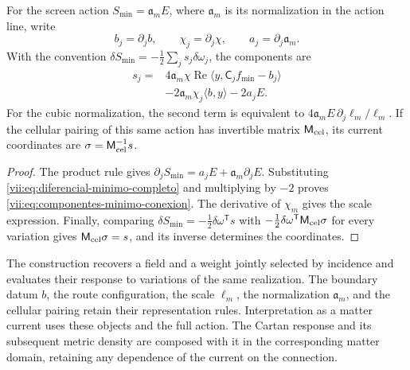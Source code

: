 \begin{theorem}
\label{vii:thm:componentes-minimo-conexion}
For the screen action
\(S_{\min}=\mathfrak a_m E\), where \(\mathfrak a_m\) is its
normalization in the action line, write
\[
 b_j=\partial_jb,\qquad \chi_j=\partial_j\chi,
 \qquad a_j=\partial_j\mathfrak a_m.
\]
With the convention \(\delta S_{\min}=-\tfrac12\sum_j s_j\delta\omega_j\),
the components are
\begin{equation}
 \begin{split}
 s_j={}&4\mathfrak a_m\chi\operatorname{Re}
             \langle y,\mathsf C_jf_{\min}-b_j\rangle\\
      &-2\mathfrak a_m\chi_j\langle b,y\rangle-2a_jE.
 \end{split}
 \label{vii:eq:componentes-minimo-conexion}
\end{equation}
For the cubic normalization, the second term is equivalent to
\(4\mathfrak a_m E\,\partial_j\ell_m/\ell_m\).
If the cellular pairing of this same action has invertible matrix
\(\mathsf M_{\rm cel}\), its current coordinates are
\(\sigma=\mathsf M_{\rm cel}^{-1}s\).
\end{theorem}

\begin{proof}
The product rule gives
\(\partial_jS_{\min}=a_jE+\mathfrak a_m\partial_jE\).
Substituting \eqref{vii:eq:diferencial-minimo-completo} and
multiplying by \(-2\) proves \eqref{vii:eq:componentes-minimo-conexion}.
The derivative of \(\chi_m\) gives the scale expression.
Finally, comparing
\(\delta S_{\min}=-\tfrac12\delta\omega^{\mathsf T}s\)
with \(-\tfrac12\delta\omega^{\mathsf T}\mathsf M_{\rm cel}\sigma\)
for every variation gives \(\mathsf M_{\rm cel}\sigma=s\),
and its inverse determines the coordinates.
\end{proof}

The construction recovers a field and a weight jointly selected by
incidence and evaluates their response to variations of the same
realization. The boundary datum \(b\), the route configuration, the scale
\(\ell_m\), the normalization \(\mathfrak a_m\), and the
cellular pairing retain their representation rules. Interpretation as a
matter current uses these objects and the full action. The Cartan
response and its subsequent metric density are composed with it in
the corresponding matter domain, retaining any dependence of the
current on the connection.
